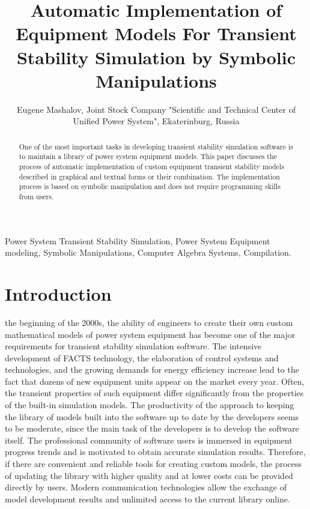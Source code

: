 \documentclass[lettersize,journal]{IEEEtran}
\begin{document}
\title{Automatic Implementation of Equipment Models For Transient Stability Simulation by Symbolic Manipulations}

\author {Eugene Mashalov, Joint Stock Company "Scientific and Technical Center of Unified Power System", Ekaterinburg, Russia}




\maketitle

\begin{abstract}
One of the most important tasks in developing transient stability simulation software is to maintain a library of power system equipment models. 
This paper discusses the process of automatic implementation of custom equipment transient stability models described in graphical and textual forms or their combination. 
The implementation process is based on symbolic manipulation and does not require programming skills from users.
\end{abstract}

\begin{IEEEkeywords}
Power System Transient Stability Simulation, Power System Equipment modeling, Symbolic Manipulations, Computer Algebra Systems, Compilation.
\end{IEEEkeywords}

\section{Introduction}
 the beginning of the 2000s, the ability of engineers to create their own custom mathematical models of power system equipment 
has become one of the major requirements for transient stability simulation software. The intensive development of FACTS technology, 
the elaboration of control systems and technologies, and the growing demands for energy efficiency increase lead to the fact that dozens 
of new equipment units appear on the market every year. Often, the transient properties of such equipment differ significantly from the properties of 
the built-in simulation models. The productivity of the approach to keeping the library of models built into the software up to date by the developers 
seems to be moderate, since the main task of the developers is to develop the software itself. 
The professional community of software users is immersed in equipment progress trends and is motivated to obtain accurate simulation results. 
Therefore, if there are convenient and reliable tools for creating custom models, the process of updating the library with higher quality and at lower costs 
can be provided directly by users. Modern communication technologies allow the exchange of model development results and unlimited access to the current library online.
\end{document}
